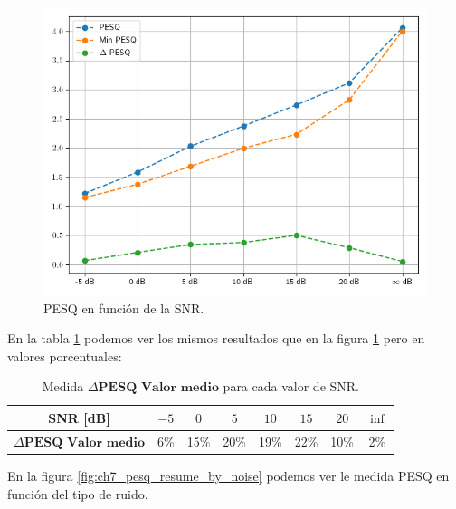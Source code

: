 \begin{figure}
	\centering
	\centerline{\includegraphics[scale=0.70]{images/ch7/objective_metrics/metric_PESQ.png}}
	\caption{PESQ en función de la SNR.}
	\label{fig:ch7_pesq_resume}
\end{figure}

En la tabla \ref{table:neural_filter_pesq_resume} podemos ver los mismos resultados que en la figura \ref{fig:ch7_pesq_resume} pero en valores porcentuales:

\begin{table}[ht]
	\centering
	\begin{tabular}{ |c|c|c|c|c|c|c|c| } 
		\hline
		SNR [dB] & $-5$ & $0$ & $5$ & $10$ & $15$ & $20$ & $\inf$ \\ 
		\hline
		$\Delta \textbf{PESQ Valor medio}$ & 6\%  & 15\%  & 20\% & 19\% & 22\% & 10\% & 2\% \\
		\hline
	\end{tabular}
	\caption{Medida $\Delta \textbf{PESQ Valor medio}$ para cada valor de SNR.}
	\label{table:neural_filter_pesq_resume}
\end{table}

En la figura \ref{fig:ch7_pesq_resume_by_noise} podemos ver le medida PESQ en función del tipo de ruido. 

